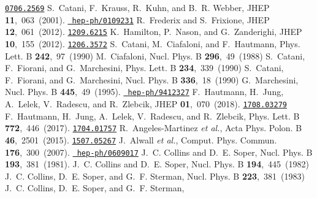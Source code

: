 \documentclass[11pt]{article} \usepackage{mystyle-new}
\begin{document}
\begin{mcbibliography}{10}
\newblock \href{http://www.arXiv.org/abs/0706.2569}{{\tt 0706.2569}}\relax
\relax
{}
S.~Catani, F.~Krauss, R.~Kuhn, and B.~R. Webber,
\newblock JHEP{} {\bf 11},~063~(2001).
\newblock \href{http://www.arXiv.org/abs/hep-ph/0109231}{{\tt
  hep-ph/0109231}}\relax
\relax
{}
R.~Frederix and S.~Frixione,
\newblock JHEP{} {\bf 12},~061~(2012).
\newblock \href{http://www.arXiv.org/abs/1209.6215}{{\tt 1209.6215}}\relax
\relax
{}
K.~Hamilton, P.~Nason, and G.~Zanderighi,
\newblock JHEP{} {\bf 10},~155~(2012).
\newblock \href{http://www.arXiv.org/abs/1206.3572}{{\tt 1206.3572}}\relax
\relax
{}
S.~Catani, M.~Ciafaloni, and F.~Hautmann,
\newblock Phys. Lett. B{} {\bf 242},~97~(1990)\relax
\relax
{}
M.~Ciafaloni,
\newblock Nucl. Phys. B{} {\bf 296},~49~(1988)\relax
\relax
{}
S.~Catani, F.~Fiorani, and G.~Marchesini,
\newblock Phys. Lett. B{} {\bf 234},~339~(1990)\relax
\relax
{}
S.~Catani, F.~Fiorani, and G.~Marchesini,
\newblock Nucl. Phys. B{} {\bf 336},~18~(1990)\relax
\relax
{}
G.~Marchesini,
\newblock Nucl. Phys. B{} {\bf 445},~49~(1995).
\newblock \href{http://www.arXiv.org/abs/hep-ph/9412327}{{\tt
  hep-ph/9412327}}\relax
\relax
{}
F.~Hautmann, H.~Jung, A.~Lelek, V.~Radescu, and R.~Zlebcik,
\newblock JHEP{} {\bf 01},~070~(2018).
\newblock \href{http://www.arXiv.org/abs/1708.03279}{{\tt 1708.03279}}\relax
\relax
{}
F.~Hautmann, H.~Jung, A.~Lelek, V.~Radescu, and R.~Zlebcik,
\newblock Phys. Lett. B{} {\bf 772},~446~(2017).
\newblock \href{http://www.arXiv.org/abs/1704.01757}{{\tt 1704.01757}}\relax
\relax
{}
R.~Angeles-Martinez {\em et al.},
\newblock Acta Phys. Polon. B{} {\bf 46},~2501~(2015).
\newblock \href{http://www.arXiv.org/abs/1507.05267}{{\tt 1507.05267}}\relax
\relax
{}
J.~Alwall {\em et al.},
\newblock Comput. Phys. Commun.{} {\bf 176},~300~(2007).
\newblock \href{http://www.arXiv.org/abs/hep-ph/0609017}{{\tt
  hep-ph/0609017}}\relax
\relax
{}
J.~C. Collins and D.~E. Soper,
\newblock Nucl. Phys. B{} {\bf 193},~381~(1981).
\relax
\relax
{}
J.~C. Collins and D.~E. Soper,
\newblock Nucl. Phys. B{} {\bf 194},~445~(1982)\relax
\relax
{}
J.~C. Collins, D.~E. Soper, and G.~F. Sterman,
\newblock Nucl. Phys. B{} {\bf 223},~381~(1983)\relax
\relax
{}
J.~C. Collins, D.~E. Soper, and G.~F. Sterman,

\end{mcbibliography}
\end{document}
